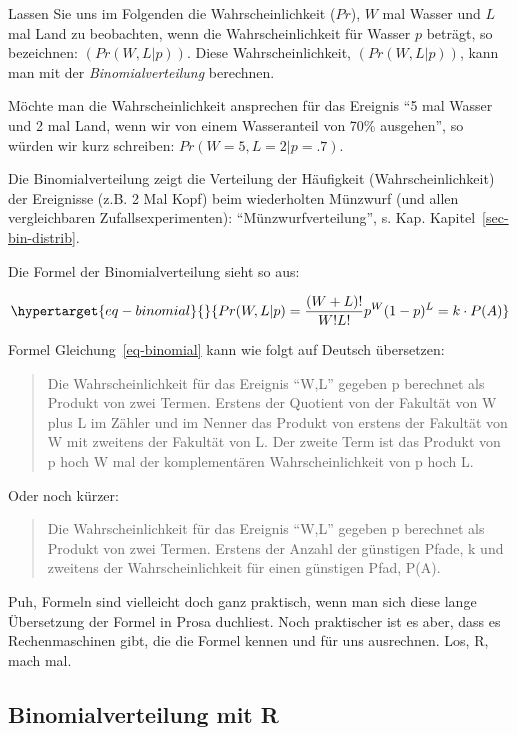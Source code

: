 \documentclass[
  a4paper,
  DIV=11]{scrreprt}
\theoremstyle{definition}
\theoremstyle{remark}
\begin{document}
Lassen Sie uns im Folgenden die Wahrscheinlichkeit (\(Pr\)), \(W\) mal
Wasser und \(L\) mal Land zu beobachten, wenn die Wahrscheinlichkeit für
Wasser \(p\) beträgt, so bezeichnen: \((Pr(W,L | p))\). Diese
Wahrscheinlichkeit, \((Pr(W,L | p))\), kann man mit der
\emph{Binomialverteilung} berechnen.

Möchte man die Wahrscheinlichkeit ansprechen für das Ereignis ``5 mal
Wasser und 2 mal Land, wenn wir von einem Wasseranteil von 70\%
ausgehen'', so würden wir kurz schreiben: \(Pr(W=5, L=2 | p=.7)\).

Die Binomialverteilung zeigt die Verteilung der Häufigkeit
(Wahrscheinlichkeit) der Ereignisse (z.B. 2 Mal Kopf) beim wiederholten
Münzwurf (und allen vergleichbaren Zufallsexperimenten):
``Münzwurfverteilung'', s. Kap. Kapitel~\ref{sec-bin-distrib}.

Die Formel der Binomialverteilung sieht so aus:

\begin{equation}\protect\hypertarget{eq-binomial}{}{Pr(W,L|p) = \frac{(W+L)!}{W!L!}p^W(1-p)^L = k \cdot P(A)}\label{eq-binomial}\end{equation}

Formel Gleichung~\ref{eq-binomial} kann wie folgt auf Deutsch
übersetzen:

\begin{quote}
Die Wahrscheinlichkeit für das Ereignis ``W,L'' gegeben p berechnet als
Produkt von zwei Termen. Erstens der Quotient von der Fakultät von W
plus L im Zähler und im Nenner das Produkt von erstens der Fakultät von
W mit zweitens der Fakultät von L. Der zweite Term ist das Produkt von p
hoch W mal der komplementären Wahrscheinlichkeit von p hoch L.
\end{quote}

Oder noch kürzer:

\begin{quote}
Die Wahrscheinlichkeit für das Ereignis ``W,L'' gegeben p berechnet als
Produkt von zwei Termen. Erstens der Anzahl der günstigen Pfade, k und
zweitens der Wahrscheinlichkeit für einen günstigen Pfad, P(A).
\end{quote}

Puh, Formeln sind vielleicht doch ganz praktisch, wenn man sich diese
lange Übersetzung der Formel in Prosa duchliest. Noch praktischer ist es
aber, dass es Rechenmaschinen gibt, die die Formel kennen und für uns
ausrechnen. Los, R, mach mal.

\hypertarget{binomialverteilung-mit-r}{%
\subsection{Binomialverteilung mit R}\label{binomialverteilung-mit-r}}
\end{document}
